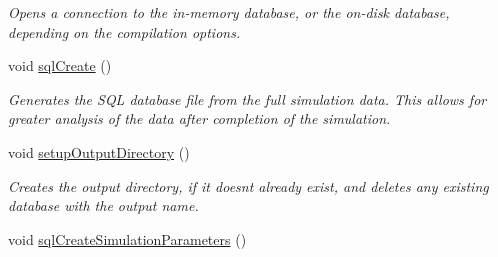 \begin{DoxyCompactItemize}
\begin{DoxyCompactList}\small\item\em Opens a connection to the in-\/memory database, or the on-\/disk database, depending on the compilation options. \end{DoxyCompactList}\item 
void \hyperlink{class_tree_ae784a6ed362f6c5263ee797759f715b6}{sql\+Create} ()\hypertarget{class_tree_ae784a6ed362f6c5263ee797759f715b6}{}\label{class_tree_ae784a6ed362f6c5263ee797759f715b6}

\begin{DoxyCompactList}\small\item\em Generates the S\+QL database file from the full simulation data. This allows for greater analysis of the data after completion of the simulation. \end{DoxyCompactList}\item 
void \hyperlink{class_tree_aea2222fa1237ba2e72f516c2b6bb02c9}{setup\+Output\+Directory} ()\hypertarget{class_tree_aea2222fa1237ba2e72f516c2b6bb02c9}{}\label{class_tree_aea2222fa1237ba2e72f516c2b6bb02c9}

\begin{DoxyCompactList}\small\item\em Creates the output directory, if it doesn\textquotesingle{}t already exist, and deletes any existing database with the output name. \end{DoxyCompactList}\item 
void \hyperlink{class_tree_a199f47b62b9b10917ff8b89d20c543a7}{sql\+Create\+Simulation\+Parameters} ()\hypertarget{class_tree_a199f47b62b9b10917ff8b89d20c543a7}{}\label{class_tree_a199f47b62b9b10917ff8b89d20c543a7}


\end{DoxyCompactItemize}
